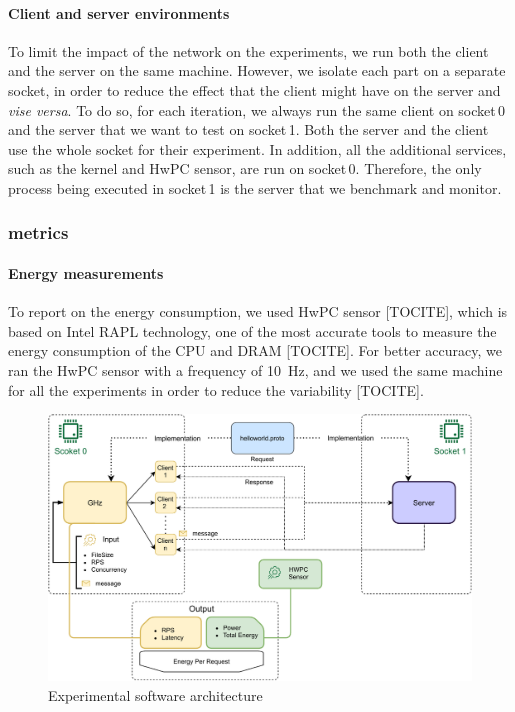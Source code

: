 \paragraph{Client and server environments}
To limit the impact of the network on the experiments, we run both the client and the server on the same machine.
However, we isolate each part on a separate socket, in order to reduce the effect that the client might have on the server and \emph{vise versa}.
To do so, for each iteration, we always run the same client on \textsf{socket\,0} and the server that we want to test on \textsf{socket\,1}.
Both the server and the client use the whole socket for their experiment.
In addition, all the additional services, such as the kernel and HwPC sensor, are run on \textsf{socket\,0}.
Therefore, the only process being executed in \textsf{socket\,1} is the server that we benchmark and monitor.

\subsubsection{metrics}
\paragraph{Energy measurements}
To report on the energy consumption, we used HwPC sensor [TOCITE], which is based on Intel RAPL technology, one of the most accurate tools to measure the energy consumption of the CPU and DRAM [TOCITE].
For better accuracy, we ran the HwPC sensor with a frequency of 10~Hz, and we used the same machine for all the experiments in order to reduce the variability [TOCITE].

\begin{figure}[!hbt]
    \begin{center}
        \includegraphics[width=.8\linewidth]{imgs/rpcprotocol}
    \end{center}
    \caption{Experimental software architecture}\label{fig:rpcprotocol}
\end{figure}


